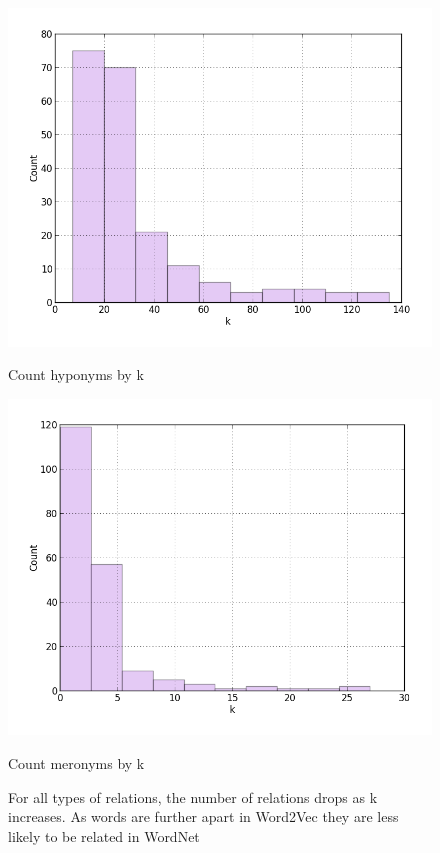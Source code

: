 \documentclass{article}
\begin{document}
\begin{figure}
\vspace*{0.5cm} %
\begin{minipage}[t]{0.45\textwidth}
\includegraphics[width=\linewidth]{Hyponym_Distance.png}
\caption{Count hyponyms by k}
\label{fig:hyponyms}
\end{minipage}
\hspace{\fill}
\begin{minipage}[t]{0.45\textwidth}
\includegraphics[width=\linewidth]{Meronym_Distance.png}
\caption{Count meronyms by k}
\label{fig:meronyms}
\end{minipage}
\caption{For all types of relations, the number of relations drops as k increases. As words are further apart in Word2Vec they are less likely to be related in WordNet}
\end{figure}
\end{document}
